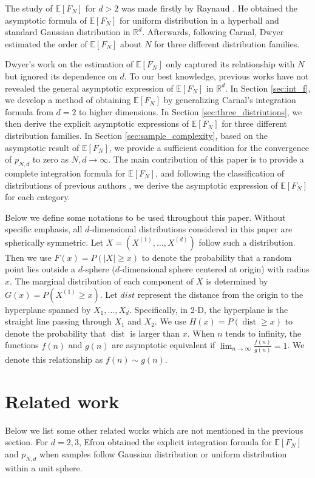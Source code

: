 \documentclass{aptpub}
\DeclareMathOperator{\dist}{dist}
\def\E{\mathbb{E}}
\def\R{\mathbb{R}}
\begin{document}
The study of $\E[F_N]$ for $d>2$ was made firstly by
Raynaud
\cite{raynaud1970enveloppe}.
He obtained the asymptotic formula of $\E[F_N]$
for uniform distribution in a hyperball
and standard Gaussian distribution in $\mathbb{R}^d$.
Afterwards, following Carnal, Dwyer \cite{dwyer1991convex}
estimated the order of $\E[F_N]$ about $N$
for three different distribution families.

Dwyer's work on the estimation of $\E[F_N]$ only captured its relationship with $N$ but ignored its
dependence on $d$. To our best knowledge, previous works have not revealed the general asymptotic expression of $\E[F_N]$ in $\R^d$.
In Section \ref{sec:int_f}, we develop a method of obtaining $\E[F_N]$ by generalizing Carnal's integration formula
from $d=2$ to higher dimensions.
In Section \ref{sec:three_distriutions}, we then derive the explicit asymptotic
expressions of $\E[F_N]$ for three different distribution families.
In Section \ref{sec:sample_complexity}, based on the asymptotic result of $\E[F_N]$,
we provide a sufficient condition for the convergence of $p_{N,d}$ to zero as $N,d \to \infty$.
The main contribution of this paper is to provide a complete integration formula for $\E[F_N]$,
and following the classification of distributions of previous authors \cite{carnal1970konvexe,dwyer1991convex},
we derive the asymptotic expression
of $\E[F_N]$ for each category.

Below we define some notations to be used throughout this paper.
Without specific emphasis, all $d$-dimensional distributions considered in this paper are spherically symmetric.
Let $X=(X^{(1)},\dots, X^{(d)})$ follow such a distribution.
Then we use $F(x)=P(|X|\geq x)$ to denote the probability that a random point lies outside
a $d$-sphere ($d$-dimensional sphere centered at origin) with radius $x$.
The marginal distribution of each component of $X$ is determined by $G(x)=P(X^{(1)}\geq x)$.
Let $dist$ represent the distance from the origin to the hyperplane spanned by $X_1, \dots, X_d$.
Specifically, in 2-D, the hyperplane is the straight line passing through $X_1$ and $X_2$.
We use $H(x)=P(\dist\geq x)$ to denote the probability that $\dist$ is larger than $x$.
When $n$ tends to infinity, the functions $f(n)$ and $g(n)$ are asymptotic equivalent if $\lim_{n\to \infty} \frac{f(n)}{g(n)}=1$.
We denote this relationship as $f(n) \sim g(n)$.

\section{Related work}
Below we list some other related works which are not mentioned in the previous section.
For $d=2,3$, Efron \cite{efron1965convex} obtained the explicit integration formula for $\E[F_N]$ and $p_{N,d}$ 
when samples follow Gaussian distribution or uniform distribution within a unit sphere.
\end{document}
